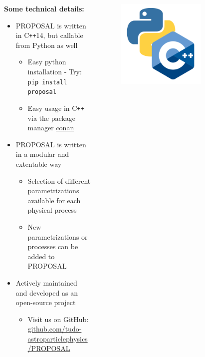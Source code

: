 \begin{frame}[c]
  \begin{columns}[onlytextwidth]
  \begin{column}{0.6\textwidth}
  \textbf{Some technical details:}
  \begin{itemize}
      \setlength{\itemsep}{3pt}
      \item PROPOSAL is written in C\texttt{++}14, but callable from Python as well
          \begin{itemize}
              \item[\rightarrow] Easy python installation - Try: \texttt{pip install proposal}
              \item[\rightarrow] Easy usage in C\texttt{++} via the package manager \href{https://conan.io/center/proposal}{conan}
          \end{itemize}
      \item PROPOSAL is written in a modular and extentable way
          \begin{itemize}
              \item[\rightarrow] Selection of different parametrizations available for each physical process
              \item[\rightarrow] New parametrizations or processes can be added to PROPOSAL
          \end{itemize} 
      \item Actively maintained and developed as an open-source project
          \begin{itemize}
              \item[\rightarrow] Visit us on GitHub: \url{github.com/tudo-astroparticlephysics/PROPOSAL}
          \end{itemize}
  \end{itemize}
  \end{column}
  \begin{column}{0.4\textwidth}
    \begin{figure}
        \centering
        \includegraphics[width=0.7\textwidth]{logos/cpp-python.png}
    \end{figure}
  \end{column}
  \end{columns}
\end{frame}